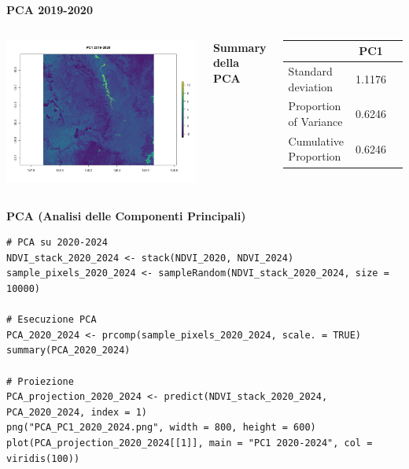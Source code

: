 \documentclass{beamer}
\begin{document}
\begin{frame}{\textbf{PCA 2019-2020}}
\begin{columns}
    \centering
    \includegraphics[width=\textwidth]{PCA_PC1_2019_2020.png}
    
    \centering
    \textbf{Summary della PCA}
    \begin{table}
        \centering
        \begin{tabular}{lcc}
            \toprule
            & PC1 \\
            \midrule
            Standard deviation     & 1.1176 \\
            Proportion of Variance & 0.6246 \\
            Cumulative Proportion  & 0.6246 \\
            \bottomrule
        \end{tabular}
    \end{table}
\end{columns}
\end{frame}

\begin{frame}[fragile]{\textbf{PCA (Analisi delle Componenti Principali)}}
\begin{lstlisting}
# PCA su 2020-2024
NDVI_stack_2020_2024 <- stack(NDVI_2020, NDVI_2024)
sample_pixels_2020_2024 <- sampleRandom(NDVI_stack_2020_2024, size = 10000)

# Esecuzione PCA
PCA_2020_2024 <- prcomp(sample_pixels_2020_2024, scale. = TRUE)
summary(PCA_2020_2024)

# Proiezione
PCA_projection_2020_2024 <- predict(NDVI_stack_2020_2024, PCA_2020_2024, index = 1)
png("PCA_PC1_2020_2024.png", width = 800, height = 600)
plot(PCA_projection_2020_2024[[1]], main = "PC1 2020-2024", col = viridis(100))
\end{lstlisting}
\end{frame}
\end{document}
